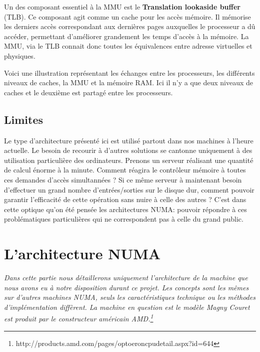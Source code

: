       Un des composant essentiel à la MMU est le \textbf{Translation lookaside
        buffer} (TLB). Ce composant agit comme un cache pour les accès
      mémoire. Il mémorise les derniers accès correspondant aux dernières pages
      auxquelles le processeur a dû accéder, permettant d'améliorer grandement
      les temps d'accès à la mémoire. La MMU, via le TLB connait donc toutes les
      équivalences entre adresse virtuelles et physiques.\newline

      Voici une illustration représentant les échanges entre les processeurs,
      les différents niveaux de caches, la MMU et la mémoire RAM. Ici il n'y a
      que deux niveaux de caches et le deuxième est partagé entre les
      processeurs.
    


    \subsection{Limites}
  
      Le type d'architecture présenté ici est utilisé partout dans nos machines
      à l'heure actuelle. Le besoin de recourir à d'autres solutions se cantonne
      uniquement à des utilisation particulière des ordinateurs. Prenons un
      serveur réalisant une quantité de calcul énorme à la minute. Comment
      réagira le contrôleur mémoire à toutes ces demandes d'accès simultannées ?
      Si ce même serveur à maintenant besoin d'effectuer un grand nombre
      d'entrées/sorties sur le disque dur, comment pouvoir garantir l'efficacité
      de cette opération sans nuire à celle des autres ?  C'est dans cette
      optique qu'on été pensée les architectures NUMA: pouvoir répondre à ces
      problématiques particulières qui ne correspondent pas à celle du grand
      public.

\newpage

  \section{L'architecture NUMA}
    
    \textit{Dans cette partie nous détaillerons uniquement l'architecture de la
      machine que nous avons eu à notre disposition durant ce projet. Les
      concepts sont les mêmes sur d'autres machines NUMA, seuls les
      caractéristiques technique ou les méthodes d'implémentation diffèrent. La
      machine en question est le modèle \og Magny Cour\fg et est produit par le
      constructeur américain
      AMD.\footnote{http://products.amd.com/pages/optoeroncpudetail.aspx?id=644}\newline}



